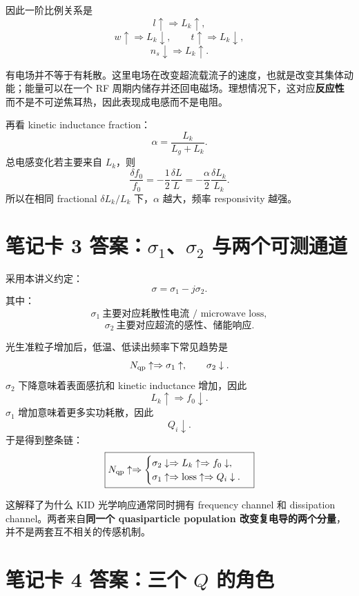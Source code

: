 \documentclass[11pt,a4paper,openany]{ctexrep}
\begin{document}
因此一阶比例关系是
\[
l\uparrow\Rightarrow L_k\uparrow,
\]
\[
w\uparrow\Rightarrow L_k\downarrow,
\qquad
t\uparrow\Rightarrow L_k\downarrow,
\]
\[
n_s\downarrow\Rightarrow L_k\uparrow.
\]

\begin{answerbox}[title=为什么这不是“电阻”？]
有电场并不等于有耗散。这里电场在改变超流载流子的速度，也就是改变其集体动能；能量可以在一个 RF 周期内储存并还回电磁场。理想情况下，这对应\textbf{反应性}而不是不可逆焦耳热，因此表现成电感而不是电阻。
\end{answerbox}

再看 kinetic inductance fraction：
\[
\alpha=\frac{L_k}{L_g+L_k}.
\]
总电感变化若主要来自 $L_k$，则
\[
\frac{\delta f_0}{f_0}
=-\frac12\frac{\delta L}{L}
=-\frac{\alpha}{2}\frac{\delta L_k}{L_k}.
\]
所以在相同 fractional $\delta L_k/L_k$ 下，$\alpha$ 越大，频率 responsivity 越强。

\section{笔记卡 3 答案：$\sigma_1$、$\sigma_2$ 与两个可测通道}

采用本讲义约定：
\[
\sigma=\sigma_1-j\sigma_2.
\]
其中：
\[
\boxed{\sigma_1\ \text{主要对应耗散性电流 / microwave loss}},
\]
\[
\boxed{\sigma_2\ \text{主要对应超流的感性、储能响应}}.
\]

光生准粒子增加后，低温、低读出频率下常见趋势是
\[
N_{\rm qp}\uparrow
\Rightarrow
\sigma_1\uparrow,
\qquad
\sigma_2\downarrow.
\]
$\sigma_2$ 下降意味着表面感抗和 kinetic inductance 增加，因此
\[
L_k\uparrow\Rightarrow f_0\downarrow.
\]
$\sigma_1$ 增加意味着更多实功耗散，因此
\[
Q_i\downarrow.
\]
于是得到整条链：
\[
\boxed{
N_{\rm qp}\uparrow
\Rightarrow
\begin{cases}
\sigma_2\downarrow\Rightarrow L_k\uparrow\Rightarrow f_0\downarrow,\\
\sigma_1\uparrow\Rightarrow \text{loss}\uparrow\Rightarrow Q_i\downarrow.
\end{cases}}
\]

\begin{answerbox}[title=工程意义]
这解释了为什么 KID 光学响应通常同时拥有 frequency channel 和 dissipation channel。两者来自\textbf{同一个 quasiparticle population 改变复电导的两个分量}，并不是两套互不相关的传感机制。
\end{answerbox}

\section{笔记卡 4 答案：三个 $Q$ 的角色}
\end{document}

